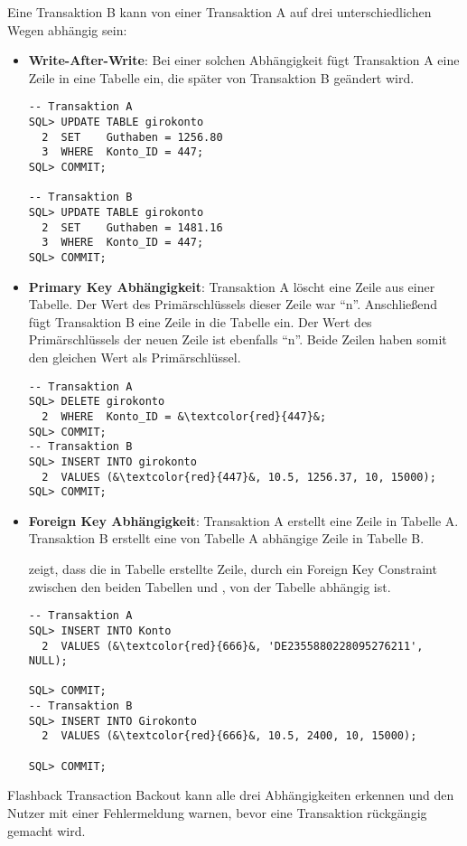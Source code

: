           Eine Transaktion B kann von einer Transaktion A auf drei
          unterschiedlichen Wegen abhängig sein:
\clearpage
          \begin{itemize}
            \item \textbf{Write-After-Write}: Bei einer solchen Abhängigkeit fügt Transaktion A eine Zeile in eine Tabelle ein, die später von Transaktion B geändert wird.
              \begin{lstlisting}[caption={Eine Write-After-Write Abhängigkeit},label=admin1709,language=oracle_sql]
-- Transaktion A
SQL> UPDATE TABLE girokonto
  2  SET    Guthaben = 1256.80
  3  WHERE  Konto_ID = 447;
SQL> COMMIT;

-- Transaktion B
SQL> UPDATE TABLE girokonto
  2  SET    Guthaben = 1481.16
  3  WHERE  Konto_ID = 447;
SQL> COMMIT;
              \end{lstlisting}
            \item \textbf{Primary Key Abhängigkeit}: Transaktion A löscht eine Zeile aus einer Tabelle. Der Wert des Primärschlüssels dieser Zeile war \enquote{n}. Anschließend fügt Transaktion B eine Zeile in die Tabelle ein. Der Wert des Primärschlüssels der neuen Zeile ist ebenfalls \enquote{n}. Beide Zeilen haben somit den gleichen Wert als Primärschlüssel.
              \begin{lstlisting}[caption={Eine Primary Key Abhängigkeit},label=admin1710,language=oracle_sql]
-- Transaktion A
SQL> DELETE girokonto
  2  WHERE  Konto_ID = &\textcolor{red}{447}&;
SQL> COMMIT;
-- Transaktion B
SQL> INSERT INTO girokonto
  2  VALUES (&\textcolor{red}{447}&, 10.5, 1256.37, 10, 15000);
SQL> COMMIT;
              \end{lstlisting}
            \item \textbf{Foreign Key Abhängigkeit}: Transaktion A erstellt eine Zeile in Tabelle A. Transaktion B erstellt eine von Tabelle A abhängige Zeile in Tabelle B.

             zeigt, dass die in Tabelle  erstellte Zeile,  durch ein Foreign Key Constraint zwischen den beiden Tabellen  und , von der Tabelle  abhängig ist.
            \begin{lstlisting}[caption={Eine Foreign Key Abhängigkeit},label=admin1711,language=oracle_sql]
-- Transaktion A
SQL> INSERT INTO Konto
  2  VALUES (&\textcolor{red}{666}&, 'DE2355880228095276211', NULL);

SQL> COMMIT;
-- Transaktion B
SQL> INSERT INTO Girokonto
  2  VALUES (&\textcolor{red}{666}&, 10.5, 2400, 10, 15000);

SQL> COMMIT;
              \end{lstlisting}
          \end{itemize}
          Flashback Transaction Backout kann alle drei Abhängigkeiten erkennen und den Nutzer mit einer Fehlermeldung warnen, bevor eine Transaktion rückgängig gemacht wird.

